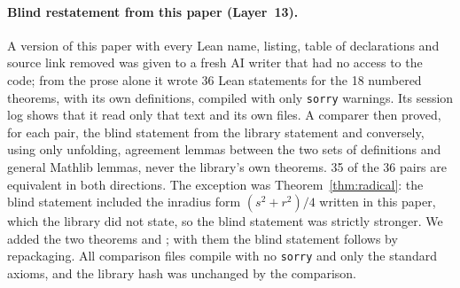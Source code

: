 \documentclass[11pt]{article}
\theoremstyle{definition}
\theoremstyle{remark}
\newcommand{\lean}[1]{\texttt{#1}}
\begin{document}
\paragraph{Blind restatement from this paper (Layer~13).} A version of this paper with every Lean
name, listing, table of declarations and source link removed was given to a fresh AI writer that had
no access to the code; from the prose alone it wrote 36 Lean statements for the 18 numbered theorems,
with its own definitions, compiled with only \lean{sorry} warnings. Its session log shows that it read
only that text and its own files. A comparer then proved, for each pair, the blind statement from the
library statement and conversely, using only unfolding, agreement lemmas between the two sets of
definitions and general Mathlib lemmas, never the library's own theorems. 35 of the 36 pairs are
equivalent in both directions. The exception was Theorem~\ref{thm:radical}: the blind statement
included the inradius form $(s^2+r^2)/4$ written in this paper, which the library did not state, so
the blind statement was strictly stronger. We added the two theorems  and
; with them the blind statement follows by
repackaging. All comparison files compile with no \lean{sorry} and only the standard axioms, and the
library hash was unchanged by the comparison.
\end{document}

